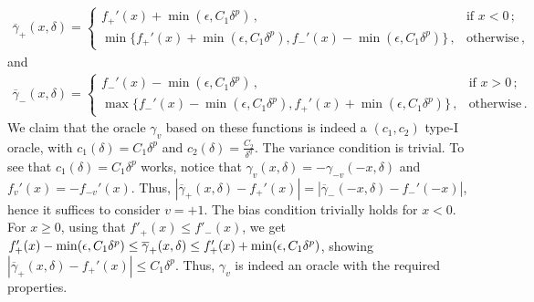 \begin{align}
\overline{\gamma}_+(x,\delta) = 
	\begin{cases}
	f_+'(x) + \min(\epsilon,C_1\delta^p)\,, & \text{if } x<0\,; \\
	\min\big\{f_+'(x) + \min(\epsilon,C_1\delta^p), f_-'(x) - \min(\epsilon,C_1\delta^p)\big\}\,, & \text{otherwise}\,,
	\end{cases}
	\label{eq:og1}
\end{align}
and
\begin{align}
\overline{\gamma}_-(x,\delta) = 
	\begin{cases}
	f_-'(x) - \min(\epsilon,C_1\delta^p)\,, & \text{if } x>0\,; \\
	\max\big\{f_-'(x) - \min(\epsilon,C_1\delta^p), f_+'(x) + \min(\epsilon,C_1\delta^p)\big\}\,, & \text{otherwise}\,.
	\end{cases}
	\label{eq:og2}
\end{align}
We claim that the oracle $\gamma_v$ based on these functions
 is indeed a $(c_1,c_2)$ type-I oracle, with $c_1(\delta)=C_1\delta^p$ and $c_2(\delta)=\frac{C_2}{\delta^q}$. The variance condition is trivial.
To see that $c_1(\delta) = C_1\delta^p$ works, 
notice that $\gamma_v(x,\delta) = -\gamma_{-v}(-x,\delta)$ and $f_v'(x) = -f_{-v}'(x)$. Thus,
$|\overline{\gamma}_+(x,\delta)-f_+'(x)| = |\overline{\gamma}_-(-x,\delta)-f_-'(-x)|$, hence it suffices to consider $v=+1$.
The bias condition trivially holds for $x<0$. For $x\ge 0$, using that $f'_+(x) \le f'_-(x)$, we get
$f'_+(x) - \min(\epsilon,C_1\delta^p) \le \overline{\gamma}_+(x,\delta) \le f'_+(x) + \min(\epsilon,C_1\delta^p)$, showing 
$|\overline{\gamma}_+(x,\delta)-f_+'(x)|  \le C_1 \delta^p$.
Thus, $\gamma_v$ is indeed an oracle with the required properties.


